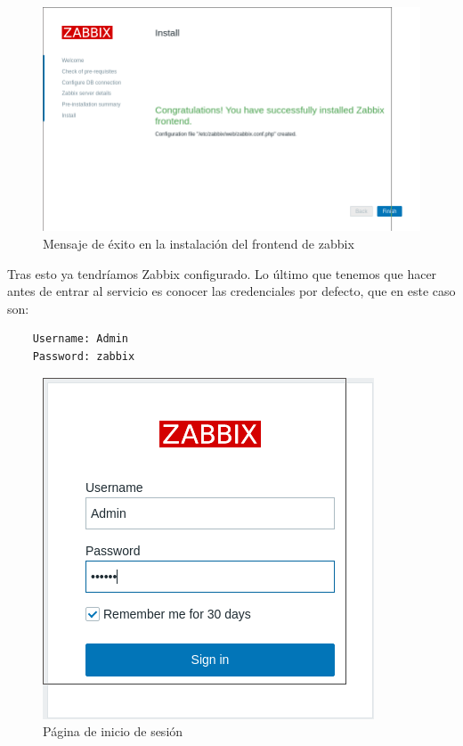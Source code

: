 \begin{figure}[H]
	\centering
	\includegraphics[scale=0.4]{graphics/img10}
	\caption{Mensaje de éxito en la instalación del frontend de zabbix}
\end{figure}

Tras esto ya tendríamos Zabbix configurado. Lo último que tenemos que hacer antes de entrar al servicio es conocer las credenciales por defecto, que en este caso son:

\begin{lstlisting}
	Username: Admin
	Password: zabbix
\end{lstlisting}

\begin{figure}[H]
	\centering
	\includegraphics[scale=0.4]{graphics/img11}
	\caption{Página de inicio de sesión}
\end{figure}

